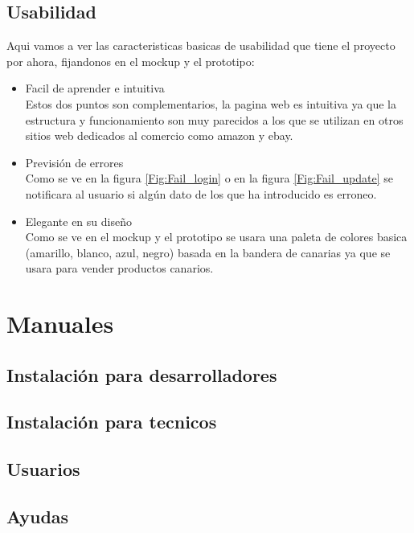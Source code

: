 \documentclass{article}
\begin{document}
\subsection{Usabilidad}
\quad Aqui vamos a ver las caracteristicas basicas de usabilidad que tiene el proyecto por ahora, fijandonos en el mockup y el prototipo:
\begin{itemize}
    \item Facil de aprender e intuitiva \\
   \phantom{ab}Estos dos puntos son complementarios, la pagina web es intuitiva ya que la estructura y funcionamiento son muy parecidos a los que se utilizan en otros sitios web dedicados al comercio como amazon y ebay.
    \item Previsión de errores\\
   \phantom{ab}Como se ve en la figura \ref{Fig:Fail_login} o en la figura \ref{Fig:Fail_update} se notificara al usuario si algún dato de los que ha introducido es erroneo.
    \item Elegante en su diseño\\
   \phantom{ab}Como se ve en el mockup y el prototipo se usara una paleta de colores basica (amarillo, blanco, azul, negro) basada en la bandera de canarias ya que se usara para vender productos canarios.
\end{itemize}
\section{Manuales}
\subsection{Instalación para desarrolladores}
\subsection{Instalación para tecnicos}
\subsection{Usuarios}
\subsection{Ayudas}
\end{document}
